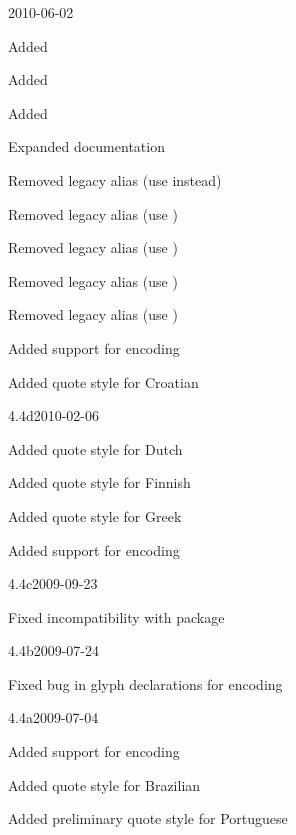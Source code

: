 \documentclass{ltxdockit}[2010/09/26]
\begin{document}
\begin{changelog}
\begin{release}{5.0}{2010-06-02}
\item Added 
\item Added 
\item Added 
\item Expanded documentation
\item Removed  legacy alias (use  instead)
\item Removed  legacy alias (use )
\item Removed  legacy alias (use )
\item Removed  legacy alias (use )
\item Removed  legacy alias (use )
\item Added support for  encoding
\item Added quote style for Croatian
\end{release}

\begin{release}{4.4d}{2010-02-06}
\item Added quote style for Dutch
\item Added quote style for Finnish
\item Added quote style for Greek
\item Added support for  encoding
\end{release}

\begin{release}{4.4c}{2009-09-23}
\item Fixed incompatibility with  package
\end{release}

\begin{release}{4.4b}{2009-07-24}
\item Fixed bug in glyph declarations for  encoding
\end{release}

\begin{release}{4.4a}{2009-07-04}
\item Added support for  encoding
\item Added quote style for Brazilian
\item Added preliminary quote style for Portuguese
\end{release}


\end{changelog}
\end{document}
